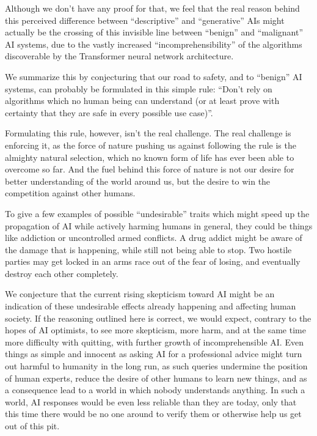 \documentclass[12pt]{article}
\begin{document}
Although we don't have any proof for that, we feel that the real reason behind this
perceived difference between ``descriptive'' and ``generative'' AIs might actually be the
crossing of this invisible line between ``benign'' and ``malignant'' AI systems, due to
the vastly increased ``incomprehensibility'' of the algorithms discoverable by the
Transformer neural network architecture.

We summarize this by conjecturing that our road to safety, and to ``benign'' AI systems,
can probably be formulated in this simple rule: ``Don't rely on algorithms which no human
being can understand (or at least prove with certainty that they are safe in every
possible use case)''.

Formulating this rule, however, isn't the real challenge. The real challenge is enforcing
it, as the force of nature pushing us against following the rule is the almighty natural
selection, which no known form of life has ever been able to overcome so far. And the
fuel behind this force of nature is not our desire for better understanding of the world
around us, but the desire to win the competition against other humans.

To give a few examples of possible ``undesirable'' traits which might speed up the
propagation of AI while actively harming humans in general, they could be things like
addiction or uncontrolled armed conflicts. A drug addict might be aware of the damage
that is happening, while still not being able to stop. Two hostile parties may get locked
in an arms race out of the fear of losing, and eventually destroy each other completely.

We conjecture that the current rising skepticism toward AI might be an indication of
these undesirable effects already happening and affecting human society. If the reasoning
outlined here is correct, we would expect, contrary to the hopes of AI optimists, to see
more skepticism, more harm, and at the same time more difficulty with quitting, with
further growth of incomprehensible AI. Even things as simple and innocent as asking AI
for a professional advice might turn out harmful to humanity in the long run, as such
queries undermine the position of human experts, reduce the desire of other humans to
learn new things, and as a consequence lead to a world in which nobody understands
anything. In such a world, AI responses would be even less reliable than they are today,
only that this time there would be no one around to verify them or otherwise help us get
out of this pit.
\end{document}
